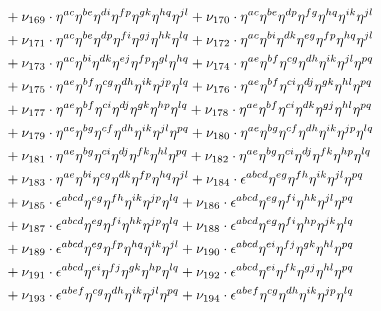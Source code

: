 \documentclass[a4paper,12pt, DIV=14, BCOR=5mm, twoside, headsepline, numbers=noenddot]{scrbook}
\begin{document}
\begin{align}
\begin{alignedat}{2}
& & &\hphantom{=}
+\nu_{169}\cdot\eta^{ac}\eta^{be}\eta^{di}\eta^{fp}\eta^{gk}\eta^{hq}\eta^{jl}+\nu_{170}\cdot\eta^{ac}\eta^{be}\eta^{dp}\eta^{fg}\eta^{hq}\eta^{ik}\eta^{jl}\\
& & &\hphantom{=}
+\nu_{171}\cdot\eta^{ac}\eta^{be}\eta^{dp}\eta^{fi}\eta^{gj}\eta^{hk}\eta^{lq}+\nu_{172}\cdot\eta^{ac}\eta^{bi}\eta^{dk}\eta^{eg}\eta^{fp}\eta^{hq}\eta^{jl}\\
& & &\hphantom{=}
+\nu_{173}\cdot\eta^{ac}\eta^{bi}\eta^{dk}\eta^{ej}\eta^{fp}\eta^{gl}\eta^{hq}+\nu_{174}\cdot\eta^{ae}\eta^{bf}\eta^{cg}\eta^{dh}\eta^{ik}\eta^{jl}\eta^{pq}\\
& & &\hphantom{=}
+\nu_{175}\cdot\eta^{ae}\eta^{bf}\eta^{cg}\eta^{dh}\eta^{ik}\eta^{jp}\eta^{lq}+\nu_{176}\cdot\eta^{ae}\eta^{bf}\eta^{ci}\eta^{dj}\eta^{gk}\eta^{hl}\eta^{pq}\\
& & &\hphantom{=}
+\nu_{177}\cdot\eta^{ae}\eta^{bf}\eta^{ci}\eta^{dj}\eta^{gk}\eta^{hp}\eta^{lq}+\nu_{178}\cdot\eta^{ae}\eta^{bf}\eta^{ci}\eta^{dk}\eta^{gj}\eta^{hl}\eta^{pq}\\
& & &\hphantom{=}
+\nu_{179}\cdot\eta^{ae}\eta^{bg}\eta^{cf}\eta^{dh}\eta^{ik}\eta^{jl}\eta^{pq}+\nu_{180}\cdot\eta^{ae}\eta^{bg}\eta^{cf}\eta^{dh}\eta^{ik}\eta^{jp}\eta^{lq}\\
& & &\hphantom{=}
+\nu_{181}\cdot\eta^{ae}\eta^{bg}\eta^{ci}\eta^{dj}\eta^{fk}\eta^{hl}\eta^{pq}+\nu_{182}\cdot\eta^{ae}\eta^{bg}\eta^{ci}\eta^{dj}\eta^{fk}\eta^{hp}\eta^{lq}\\
& & &\hphantom{=}
+\nu_{183}\cdot\eta^{ae}\eta^{bi}\eta^{cg}\eta^{dk}\eta^{fp}\eta^{hq}\eta^{jl}+ \nu_{184}\cdot\epsilon^{abcd}\eta^{eg}\eta^{fh}\eta^{ik}\eta^{jl}\eta^{pq}\\
& & &\hphantom{=}
+\nu_{185}\cdot\epsilon^{abcd}\eta^{eg}\eta^{fh}\eta^{ik}\eta^{jp}\eta^{lq}+\nu_{186}\cdot\epsilon^{abcd}\eta^{eg}\eta^{fi}\eta^{hk}\eta^{jl}\eta^{pq}
\\
& & &\hphantom{=}
+\nu_{187}\cdot\epsilon^{abcd}\eta^{eg}\eta^{fi}\eta^{hk}\eta^{jp}\eta^{lq}+\nu_{188}\cdot\epsilon^{abcd}\eta^{eg}\eta^{fi}\eta^{hp}\eta^{jk}\eta^{lq}\\
& & &\hphantom{=}
+\nu_{189}\cdot\epsilon^{abcd}\eta^{eg}\eta^{fp}\eta^{hq}\eta^{ik}\eta^{jl}+\nu_{190}\cdot\epsilon^{abcd}\eta^{ei}\eta^{fj}\eta^{gk}\eta^{hl}\eta^{pq}\\
& & &\hphantom{=}
+\nu_{191}\cdot\epsilon^{abcd}\eta^{ei}\eta^{fj}\eta^{gk}\eta^{hp}\eta^{lq}+\nu_{192}\cdot\epsilon^{abcd}\eta^{ei}\eta^{fk}\eta^{gj}\eta^{hl}\eta^{pq}\\
& & &\hphantom{=}
+\nu_{193}\cdot\epsilon^{abef}\eta^{cg}\eta^{dh}\eta^{ik}\eta^{jl}\eta^{pq}+\nu_{194}\cdot\epsilon^{abef}\eta^{cg}\eta^{dh}\eta^{ik}\eta^{jp}\eta^{lq}\\

\end{alignedat}
\end{align}
\end{document}
